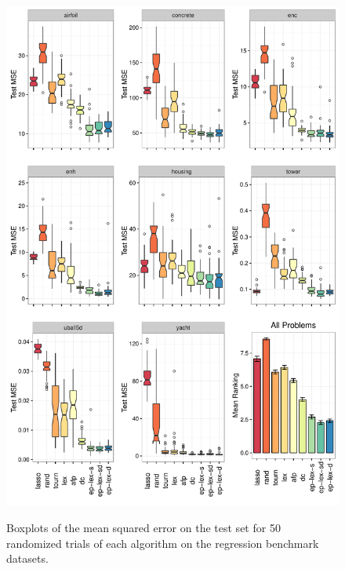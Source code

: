 \documentclass[twoside]{article}
\begin{document}
\begin{figure}
\centering
  \includegraphics[width=\textwidth]{figs/regression_boxplots.pdf}\\
  \caption{Boxplots of the mean squared error on the test set for 50 randomized trials of each algorithm on the regression benchmark datasets.}\label{fig:boxplot_reg}
\end{figure}
\end{document}
